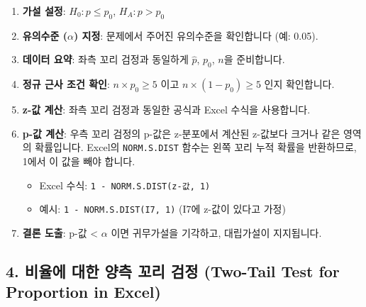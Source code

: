 \documentclass[11pt,a4paper]{article}
\theoremstyle{definition}
\begin{document}
\begin{enumerate}
    \item \textbf{가설 설정}: $H_0: p \le p_0$, $H_A: p > p_0$
    \item \textbf{유의수준 ($\alpha$) 지정}: 문제에서 주어진 유의수준을 확인합니다 (예: 0.05).
    \item \textbf{데이터 요약}: 좌측 꼬리 검정과 동일하게 $\hat{p}$, $p_0$, $n$을 준비합니다.
    \item \textbf{정규 근사 조건 확인}: $n \times p_0 \ge 5$ 이고 $n \times (1 - p_0) \ge 5$ 인지 확인합니다.
    \item \textbf{z-값 계산}: 좌측 꼬리 검정과 동일한 공식과 Excel 수식을 사용합니다.
    \item \textbf{p-값 계산}: 우측 꼬리 검정의 p-값은 z-분포에서 계산된 z-값보다 크거나 같은 영역의 확률입니다. Excel의 \texttt{NORM.S.DIST} 함수는 왼쪽 꼬리 누적 확률을 반환하므로, 1에서 이 값을 빼야 합니다.
    \begin{itemize}
        \item Excel 수식: \texttt{1 - NORM.S.DIST(z-값, 1)}
        \item 예시: \texttt{1 - NORM.S.DIST(I7, 1)} (I7에 z-값이 있다고 가정)
    \end{itemize}
    \item \textbf{결론 도출}: p-값 < $\alpha$ 이면 귀무가설을 기각하고, 대립가설이 지지됩니다.
\end{enumerate}

\subsection*{4. 비율에 대한 양측 꼬리 검정 (Two-Tail Test for Proportion in Excel)}
\end{document}
